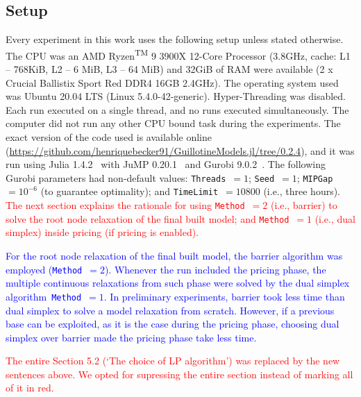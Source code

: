 \documentclass[smallextended]{svjour3}       %
\newif\iffinalversion
\newcommand{\newtext}[1]{\iffinalversion%
#1%
\else%
\textcolor{blue}{#1}%
\fi%
}
\newcommand{\oldtext}[1]{\iffinalversion%
\else%
\textcolor{red}{#1}%
\fi%
}
\begin{document}
\subsection{Setup}
\label{sec:setup}

Every experiment in this work uses the following setup unless stated otherwise.
The CPU was an AMD\textsuperscript{\textregistered} Ryzen\textsuperscript{TM} 9 3900X 12-Core Processor (3.8GHz, cache: L1 -- 768KiB, L2 -- 6 MiB, L3 -- 64 MiB) and 32GiB of RAM were available (2 x Crucial Ballistix Sport Red DDR4 16GB 2.4GHz).
The operating system used was Ubuntu 20.04 LTS (Linux 5.4.0-42-generic).
Hyper-Threading was disabled.
Each run executed on a single thread, and no runs executed simultaneously.
The computer did not run any other CPU bound task during the experiments.
The exact version of the code used is available online (\url{https://github.com/henriquebecker91/GuillotineModels.jl/tree/0.2.4}), and it was run using Julia 1.4.2~\cite{julia} with JuMP 0.20.1~\cite{JuMP} and Gurobi 9.0.2~\cite{gurobi}.
The following Gurobi parameters had non-default values: \texttt{Threads}~\(= 1\); \texttt{Seed}~\(= 1\); \texttt{MIPGap}~\(= 10^{-6}\) (to guarantee optimality); and \texttt{TimeLimit}~\(= 10800\) (i.e., three hours).
\oldtext{The next section explains the rationale for using \texttt{Method}~\(= 2\) (i.e., barrier) to solve the root node relaxation of the final built model; and \texttt{Method}~\(= 1\) (i.e., dual simplex) inside pricing (if pricing is enabled).}
\newtext{For the root node relaxation of the final built model, the barrier algorithm was employed (\texttt{Method}~\(= 2\)). Whenever the run included the pricing phase, the multiple continuous relaxations from such phase were solved by the dual simplex algorithm~\texttt{Method}~\(= 1\). In preliminary experiments, barrier took less time than dual simplex to solve a model relaxation from scratch. However, if a previous base can be exploited, as it is the case during the pricing phase, choosing dual simplex over barrier made the pricing phase take less time.}

\oldtext{The entire Section 5.2 (`The choice of LP algorithm') was replaced by the new sentences above. We opted for supressing the entire section instead of marking all of it in red.}
\end{document}
